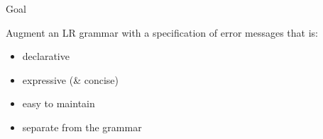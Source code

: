 \documentclass{beamer}          %
\begin{document}
\begin{frame}{Goal}

  Augment an LR grammar with a specification of error messages that is:
  \begin{itemize}
    \item declarative
    \item expressive (\& concise)
    \item easy to maintain
    \item separate from the grammar
  \end{itemize}
\end{frame}
\end{document}
